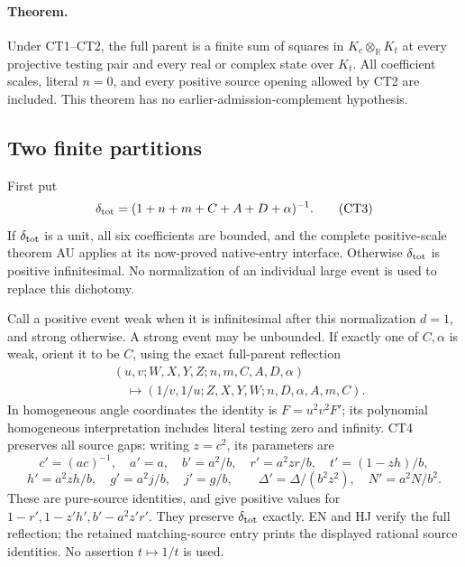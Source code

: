 \paragraph{Theorem.}
Under CT1--CT2, the full parent is a finite sum of squares in
\(K_c\otimes_{\mathbb R}K_t\) at every projective testing pair and
every real or complex state over \(K_t\).
All coefficient scales, literal \(n=0\), and every positive source
opening allowed by CT2 are included.  This theorem has no
earlier-admission-complement hypothesis.

\subsection{Two finite partitions}

First put
\[
 \delta_{\rm tot}=(1+n+m+C+A+D+\alpha)^{-1}.
\tag{CT3}
\]
If \(\delta_{\rm tot}\) is a unit, all six coefficients are bounded,
and the complete positive-scale theorem AU applies at its now-proved
native-entry interface.  Otherwise \(\delta_{\rm tot}\) is positive
infinitesimal.  No normalization of an individual large event is
used to replace this dichotomy.

Call a positive event weak when it is infinitesimal after this
normalization \(d=1\), and strong otherwise.  A strong event may be
unbounded.  If exactly one of \(C,\alpha\) is weak, orient it to be
\(C\), using the exact full-parent reflection
\[
\begin{split}
 &(u,v;W,X,Y,Z;n,m,C,A,D,\alpha)\\
 &\quad\longmapsto
 (1/v,1/u;Z,X,Y,W;n,D,\alpha,A,m,C).
\end{split}\tag{CT4}
\]
In homogeneous angle coordinates the identity is
\(F=u^2v^2F'\); its polynomial homogeneous interpretation includes
literal testing zero and infinity.  CT4 preserves all source gaps:
writing \(z=c^2\), its parameters are
\[
 c'=(ac)^{-1},\quad a'=a,\quad b'=a^2/b,\quad
 r'=a^2zr/b,\quad t'=(1-zh)/b,
\]
\[
 h'=a^2zh/b,\quad g'=a^2j/b,\quad j'=g/b,\qquad
 \Delta'=\Delta/(b^2z^2),\quad N'=a^2N/b^2 .
\tag{CT5}
\]
These are pure-source identities, and give positive values for
\(1-r',1-z'h',b'-a^2z'r'\).  They preserve
\(\delta_{\rm tot}\) exactly.  EN and HJ verify the full reflection;
the retained matching-source entry prints the displayed rational
source identities.  No assertion \(t\mapsto1/t\) is used.

